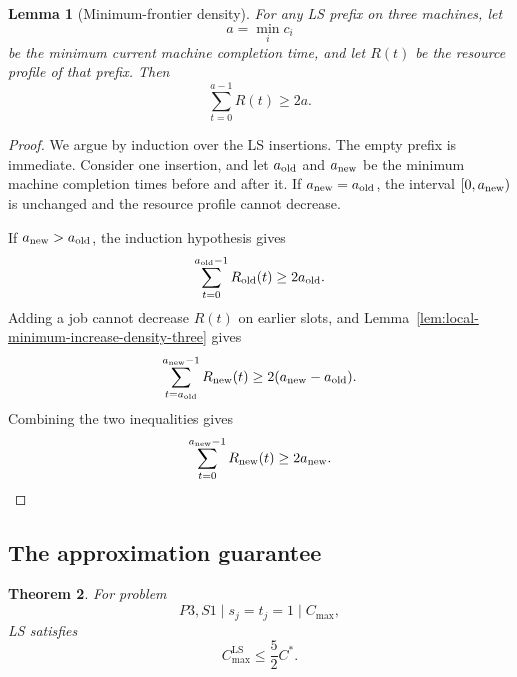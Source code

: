 \documentclass[11pt]{article}
\newtheorem{theorem}{Theorem}[section]
\newtheorem{lemma}[theorem]{Lemma}
\begin{document}
\begin{lemma}[Minimum-frontier density]
\label{lem:minimum-frontier-density-three}
For any LS prefix on three machines, let
\[
        a=\min_i c_i
\]
be the minimum current machine completion time, and let \(R(t)\) be the resource
profile of that prefix. Then
\[
        \sum_{t=0}^{a-1}R(t)\ge2a .
\]
\end{lemma}

\begin{proof}
We argue by induction over the LS insertions. The empty prefix is immediate.
Consider one insertion, and let \(a_{\rm old}\) and \(a_{\rm new}\) be the
minimum machine completion times before and after it. If
\(a_{\rm new}=a_{\rm old}\), the interval \([0,a_{\rm new})\) is unchanged and
the resource profile cannot decrease.

If \(a_{\rm new}>a_{\rm old}\), the induction hypothesis gives
\[
        \sum_{t=0}^{a_{\rm old}-1}R_{\rm old}(t)\ge2a_{\rm old}.
\]
Adding a job cannot decrease \(R(t)\) on earlier slots, and
Lemma~\ref{lem:local-minimum-increase-density-three} gives
\[
        \sum_{t=a_{\rm old}}^{a_{\rm new}-1}R_{\rm new}(t)
        \ge2(a_{\rm new}-a_{\rm old}).
\]
Combining the two inequalities gives
\[
        \sum_{t=0}^{a_{\rm new}-1}R_{\rm new}(t)\ge2a_{\rm new}.
\]
\end{proof}




\subsection{The approximation guarantee}

\begin{theorem}
\label{thm:ls-three-five-halves}
For problem 
\[
        P3,S1\mid s_j=t_j=1\mid C_{\max},
\]
LS satisfies
\[
        C_{\max}^{\mathrm{LS}}\le \frac52 C^* .
\]
\end{theorem}
\end{document}
